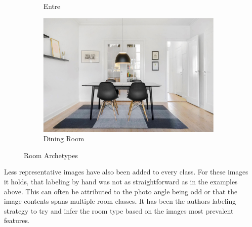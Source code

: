 \begin{figure}[H]
\begin{subfigure}{0.3\textwidth}
    \caption{Entre}
  \end{subfigure}\hfil %
  \begin{subfigure}{0.3\textwidth}
    \includegraphics[width=\linewidth]{pictures/random/example_diningroom}
    \caption{Dining Room}
  \end{subfigure}
  \caption{Room Archetypes}
  \label{fig:totallynewfigure}
\end{figure}

Less representative images have also been added to every class. For these images it holds, that labeling by hand was not as straightforward as in the examples above. 
This can often be attributed to the photo angle being odd or that the image contents spans multiple room classes. 
It has been the authors labeling strategy to try and infer the room type based on the images most prevalent features.

